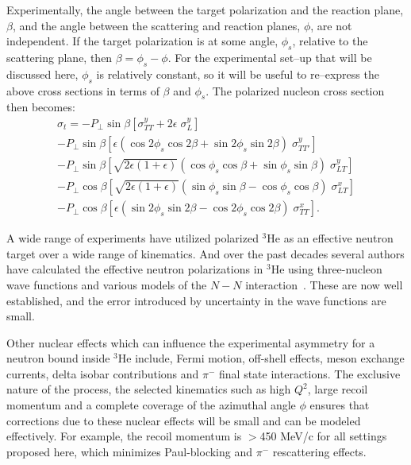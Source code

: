 \documentclass[preprint,superscriptaddress]{revtex4}
\begin{document}
Experimentally, the angle between the target polarization and the reaction
plane, $\beta$, and the angle between the scattering and reaction planes,
$\phi$, are not independent.  If the target polarization is at some angle,
$\phi_s$, relative to the scattering plane, then $\beta = \phi_s-\phi$.  For
the experimental set--up that will be discussed here, $\phi_s$ is relatively
constant, so it will be useful to re--express the above cross sections in terms
of $\beta$ and $\phi_s$.  The polarized nucleon cross section then becomes:
\begin{multline}\label{eqn:sigtarg}
\sigma_t =  - P_\perp \sin \beta \left[\sigma^y_{TT}+ 2\epsilon \; 
  \sigma^y_L \right] \\
- P_\perp \sin \beta \left[\epsilon (\cos 2\phi_s \cos 2\beta + 
  \sin 2\phi_s \sin 2\beta) \; \sigma^y_{TT'} \right]\\
- P_\perp \sin \beta \left[\sqrt{2\epsilon(1+\epsilon)}(\cos \phi_s \cos \beta 
  + \sin \phi_s \sin \beta) \; \sigma^y_{LT}\right] \\
-P_\perp \cos \beta \left[\sqrt{2\epsilon(1+\epsilon)}(\sin \phi_s \sin \beta 
  - \cos \phi_s \cos \beta)\; \sigma^x_{LT} \right]\\
-P_\perp \cos \beta \left[\epsilon (\sin 2\phi_s \sin 2\beta 
  - \cos 2\phi_s \cos 2\beta)  \; \sigma^x_{TT} \right] .
\end{multline}


A wide range of experiments have utilized polarized $^3$He as an effective
neutron target over a wide range of kinematics. And over the past decades
several authors have calculated the effective neutron polarizations in $^3$He
using three-nucleon wave functions and various models of the $N-N$
interaction~\cite{3hepol1}.  These are now well established, and the error
introduced by uncertainty in the wave functions are small.

Other nuclear effects which can influence the experimental asymmetry for a
neutron bound inside $^3$He include, Fermi motion, off-shell effects, meson
exchange currents, delta isobar contributions and $\pi^-$ final state
interactions. The exclusive nature of the process, the selected kinematics such
as high $Q^2$, large recoil momentum and a complete coverage of the azimuthal
angle $\phi$ ensures that corrections due to these nuclear effects will be
small and can be modeled effectively.  For example, the recoil momentum is 
$>$450 MeV/c for all settings proposed here, which minimizes Paul-blocking and
$\pi^-$ rescattering effects.
\end{document}
